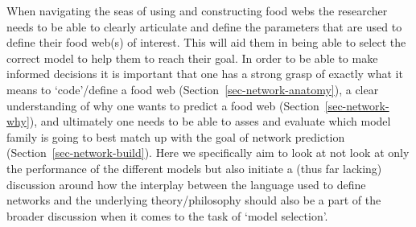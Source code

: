 \documentclass[
]{article}
\begin{document}
When navigating the seas of using and constructing food webs the
researcher needs to be able to clearly articulate and define the
parameters that are used to define their food web(s) of interest. This
will aid them in being able to select the correct model to help them to
reach their goal. In order to be able to make informed decisions it is
important that one has a strong grasp of exactly what it means to
`code'/define a food web (Section~\ref{sec-network-anatomy}), a clear
understanding of why one wants to predict a food web
(Section~\ref{sec-network-why}), and ultimately one needs to be able to
asses and evaluate which model family is going to best match up with the
goal of network prediction (Section~\ref{sec-network-build}). Here we
specifically aim to look at not look at only the performance of the
different models but also initiate a (thus far lacking) discussion
around how the interplay between the language used to define networks
and the underlying theory/philosophy should also be a part of the
broader discussion when it comes to the task of `model selection'.
\end{document}
